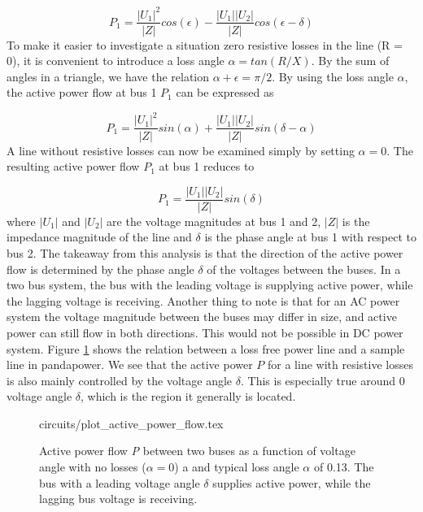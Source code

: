 \documentclass[class=book, crop=false]{standalone}
\begin{document}
\begin{equation}\label{eq:two_port_active_power}
P_{1} = \frac{|U_{1}|^2}{|Z|}cos(\epsilon) - \frac{|U_{1}||U_{2}|}{|Z|}cos(\epsilon - \delta)
\end{equation}
To make it easier to investigate a situation zero resistive losses in the line (R = 0), it is convenient to introduce a loss angle $\alpha = tan(R/X)$. By the sum of angles in a triangle, we have the relation $\alpha + \epsilon = \pi/2$. By using the loss angle $\alpha$, the active power flow at bus 1 $P_{1}$ can be expressed as

\begin{equation}\label{eq:two_port_active_power_good}
P_{1} = \frac{|U_{1}|^2}{|Z|}sin(\alpha) + \frac{|U_{1}||U_{2}|}{|Z|}sin(\delta -\alpha)
\end{equation}
A line without resistive losses can now be examined simply by setting $\alpha = 0$. The resulting active power flow $P_{1}$ at bus 1 reduces to

\begin{equation}\label{eq:two_port_active_power_lossless}
P_{1} =  \frac{|U_{1}||U_{2}|}{|Z|}sin(\delta)
\end{equation}
where $|U_{1}|$ and $|U_{2}|$ are the voltage magnitudes at bus 1 and 2, $|Z|$ is the impedance magnitude of the line and $\delta$ is the phase angle at bus 1 with respect to bus 2. The takeaway from this analysis is that the direction of the active power flow is determined by the phase angle $\delta$ of the voltages between the buses. In a two bus system, the bus with the leading voltage is supplying active power, while the lagging voltage is receiving. Another thing to note is that for an AC power system the voltage magnitude between the buses may differ in size, and active power can still flow in both directions. This would not be possible in DC power system. Figure \ref{fig:theory:active_power_flow} shows the relation between a loss free power line and a sample line in pandapower. We see that the active power $P$ for a line with resistive losses is also mainly controlled by the voltage angle $\delta$. This is especially true around 0 voltage angle $\delta$, which is the region it generally is located. 


\begin{figure}[ht!]
    \center
    {circuits/plot_active_power_flow.tex}
    \caption[size = 9]{Active power flow \textit{P} between two buses as a function of voltage angle with no losses ($\alpha=0$) a and typical loss angle $\alpha$ of 0.13. The bus with a leading voltage angle $\delta$ supplies active power, while the lagging bus voltage is receiving.} \label{fig:theory:active_power_flow}
\end{figure}
\end{document}
